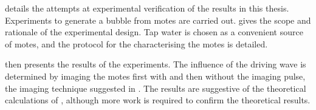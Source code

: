 

 details the attempts at experimental verification of the results in this thesis. 
Experiments to generate a bubble from  motes are carried out.
 gives the scope and rationale of the experimental design.
Tap water is chosen as a convenient source of motes,
and the protocol for the characterising the motes is detailed.

 then presents the results of the experiments.
The influence of the driving wave is determined by 
imaging the motes first with and then without the imaging pulse,
the imaging technique suggested in .
The results are suggestive of the
theoretical calculations of ,
although more work is required to confirm the theoretical results.

